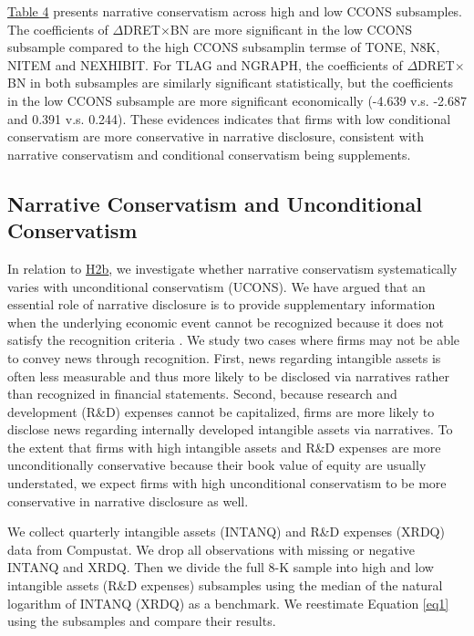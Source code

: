 \documentclass[letterpaper,12pt]{article}
\begin{document}
\begin{spacing}{1.5}
\hyperref[T4]{Table 4} presents narrative conservatism across high and low CCONS subsamples. The coefficients of $\Delta$DRET$\times$BN are more significant in the low CCONS subsample compared to the high CCONS subsamplin termse  of TONE, N8K, NITEM and NEXHIBIT. For TLAG and NGRAPH, the coefficients of $\Delta$DRET$\times$BN in both subsamples are similarly significant statistically, but the coefficients in the low CCONS subsample are more significant economically (-4.639 v.s. -2.687 and 0.391 v.s. 0.244). These evidences indicates that firms with low conditional conservatism are more conservative in narrative disclosure, consistent with narrative conservatism and conditional conservatism being supplements.

\subsection{Narrative Conservatism and Unconditional Conservatism}
\noindent In relation to \hyperref[hyp:h2b]{H2b}, we investigate whether narrative conservatism systematically varies with unconditional conservatism (UCONS). We have argued that an essential role of narrative disclosure is to provide supplementary information when the underlying economic event cannot be recognized because it does not satisfy the recognition criteria \cite{fasbStatementFinancialAccounting1984}. We study two cases where firms may not be able to convey news through recognition. First, news regarding intangible assets is often less measurable and thus more likely to be disclosed via narratives rather than recognized in financial statements. Second, because research and development (R\&D) expenses cannot be capitalized, firms are more likely to disclose news regarding internally developed intangible assets via narratives. To the extent that firms with high intangible assets and R\&D expenses are more unconditionally conservative because their book value of equity are usually understated, we expect firms with high unconditional conservatism to be more conservative in narrative disclosure as well.

We collect quarterly intangible assets (INTANQ) and R\&D expenses (XRDQ) data from Compustat. We drop all observations with missing or negative INTANQ and XRDQ. Then we divide the full 8-K sample into high and low intangible assets (R\&D expenses) subsamples using the median of the natural logarithm of INTANQ (XRDQ) as a benchmark. We reestimate Equation \eqref{eq1} using the subsamples and compare their results.


\end{spacing}
\end{document}
